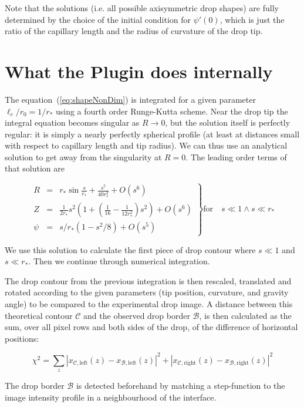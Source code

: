 \documentclass[fleqn]{scrartcl}
\begin{document}
Note that the solutions (i.e. all possible axisymmetric drop shapes)
are fully determined by the choice of the initial condition for
$\psi'(0)$, which is just the ratio of the capillary length and the
radius of curvature of the drop tip.

\section{What the Plugin does internally}
\label{sec:numerics}

The equation~(\ref{eq:shapeNonDim}) is integrated for a given parameter
$\ell_c/r_0 = 1/r_*$ using a fourth order Runge-Kutta scheme. Near the
drop tip the integral equation becomes singular as $R\to 0$, but the
solution itself is perfectly regular: it is simply a nearly perfectly
spherical profile (at least at distances small with respect to
capillary length and tip radius). We can thus use an analytical
solution to get away from the singularity at $R=0$. The leading order
terms of that solution are

\[
\left.%
\begin{array}{lll}
R & = & r_*\sin\frac{s}{r_*} + \frac{s^5}{40 r_*^2} + O(s^6) \\
Z & = & \frac{1}{2r_*} s^2 (1 + (\frac{1}{16} - \frac{1}{12r_*^2}) s^2) + O(s^6)\\
\psi & = & s/r_* (1-s^2/8) + O(s^5)
\end{array}\right\}
\mathrm{for}\quad s \ll 1 \wedge s \ll r_*
\]

We use this solution to calculate the first piece of drop contour
where $s \ll 1$ and $s \ll r_*$. Then we continue through numerical
integration.

The drop contour from the previous integration is then rescaled,
translated and rotated according to the given parameters (tip
position, curvature, and gravity angle) to be compared to the
experimental drop image. A distance between this theoretical contour
$\mathcal{C}$ and the observed drop border $\mathcal{B}$, is then
calculated as the sum, over all pixel rows and both sides of the drop,
of the difference of horizontal positions:

\[
\chi^2 = \sum_{z} |x_{\mathcal{C},\mathrm{left}}(z) - x_{\mathcal{B},\mathrm{left}}(z)|^2 +
|x_{\mathcal{C},\mathrm{right}}(z) - x_{\mathcal{B},\mathrm{right}}(z)|^2
\]

The drop border $\mathcal{B}$ is detected beforehand by matching a
step-function to the image intensity profile in a neighbourhood of the
interface.
\end{document}
